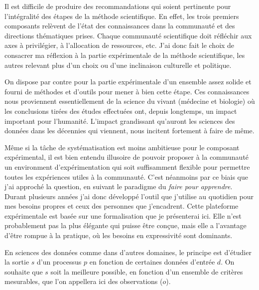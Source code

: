 Il est difficile de produire des recommandations qui soient pertinente pour l'intégralité des étapes de la méthode scientifique. En effet, les trois premiers composants relèvent de l'état des connaissances dans la communauté et des \og directions \fg thématiques prises. Chaque communauté scientifique doit réfléchir aux axes à privilégier, à l'allocation de ressources, etc. J'ai donc fait le choix de consacrer ma réflexion à la partie expérimentale de la méthode scientifique, les autres relevant plus d'un choix ou d'une inclinaison culturelle et politique.

On dispose par contre pour la partie expérimentale d'un ensemble assez solide et fourni de méthodes et d'outils pour mener à bien cette étape. Ces connaissances nous proviennent essentiellement de la science du vivant (médecine et biologie) où les conclusions tirées des études effectuées ont, depuis longtemps, un impact important pour l'humanité. L'impact grandissant qu'auront les sciences des données dans les décennies qui viennent, nous incitent fortement à faire de même.

Même si la tâche de systématisation est moins ambitieuse pour le composant expérimental, il est bien entendu illusoire de pouvoir proposer à la communauté un environment d'expérimentation qui soit suffisamment flexible pour permettre toutes les expériences utiles à la communauté. C'est néanmoins par ce biais que j'ai approché la question, en suivant le paradigme du \textsl{faire pour apprendre}. Durant plusieurs années j'ai donc développé l'outil \explanes {} que j'utilise au quotidien pour mes besoins propres et ceux des personnes que j'encadrent. Cette plateforme expérimentale est basée sur une formalisation que je présenterai ici. Elle n'est probablement pas la plus élégante qui puisse être conçue, mais elle a l'avantage d'être rompue à la pratique, où les besoins en expressivité sont dominants.



En sciences des données comme dans d'autres domaines, le principe est d'étudier la sortie $s$ d'un processus $p$ en fonction de certaines données d'entrée $d$. On souhaite que $s$ soit la meilleure possible, en fonction d'un ensemble de critères mesurables, que l'on appellera ici des \textsf
{observations} ($o$).

